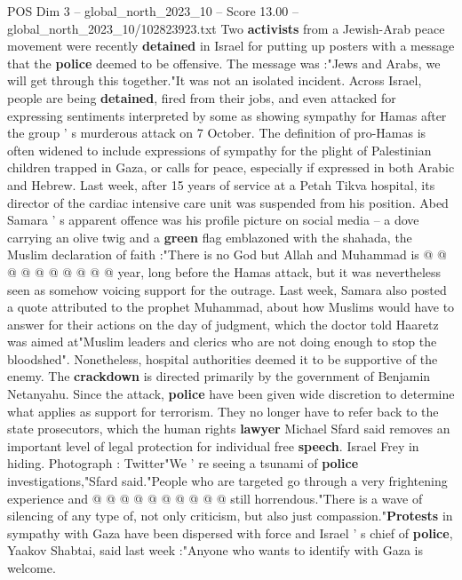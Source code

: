 \begin{textsample}{POS Dim 3 – global\_north\_2023\_10 – Score 13.00 – global\_north\_2023\_10/102823923.txt}  \label{ex:f3_pos_276}
Two \textbf{activists} from a Jewish-Arab peace movement were recently \textbf{detained} in Israel for putting up posters with a message that the \textbf{police} deemed to be offensive.
The message was :"Jews and Arabs, we will get through this together."It was not an isolated incident.
Across Israel, people are being \textbf{detained}, fired from their jobs, and even attacked for expressing sentiments interpreted by some as showing sympathy for Hamas after the group ' s murderous attack on 7 October.
The definition of pro-Hamas is often widened to include expressions of sympathy for the plight of Palestinian children trapped in Gaza, or calls for peace, especially if expressed in both Arabic and Hebrew.
Last week, after 15 years of service at a Petah Tikva hospital, its director of the cardiac intensive care unit was suspended from his position.
Abed Samara ' s apparent offence was his profile picture on social media -- a dove carrying an olive twig and a \textbf{green} flag emblazoned with the shahada, the Muslim declaration of faith :"There is no God but Allah and Muhammad is @ @ @ @ @ @ @ @ @ @ year, long before the Hamas attack, but it was nevertheless seen as somehow voicing support for the outrage.
Last week, Samara also posted a quote attributed to the prophet Muhammad, about how Muslims would have to answer for their actions on the day of judgment, which the doctor told Haaretz was aimed at"Muslim leaders and clerics who are not doing enough to stop the bloodshed".
Nonetheless, hospital authorities deemed it to be supportive of the enemy.
The \textbf{crackdown} is directed primarily by the government of Benjamin Netanyahu.
Since the attack, \textbf{police} have been given wide discretion to determine what applies as support for terrorism.
They no longer have to refer back to the state prosecutors, which the human rights \textbf{lawyer} Michael Sfard said removes an important level of legal protection for individual free \textbf{speech}.
Israel Frey in hiding.
Photograph : Twitter"We ' re seeing a tsunami of \textbf{police} investigations,"Sfard said."People who are targeted go through a very frightening experience and @ @ @ @ @ @ @ @ @ @ still horrendous."There is a wave of silencing of any type of, not only criticism, but also just compassion."\textbf{Protests} in sympathy with Gaza have been dispersed with force and Israel ' s chief of \textbf{police}, Yaakov Shabtai, said last week :"Anyone who wants to identify with Gaza is welcome.

\end{textsample}
